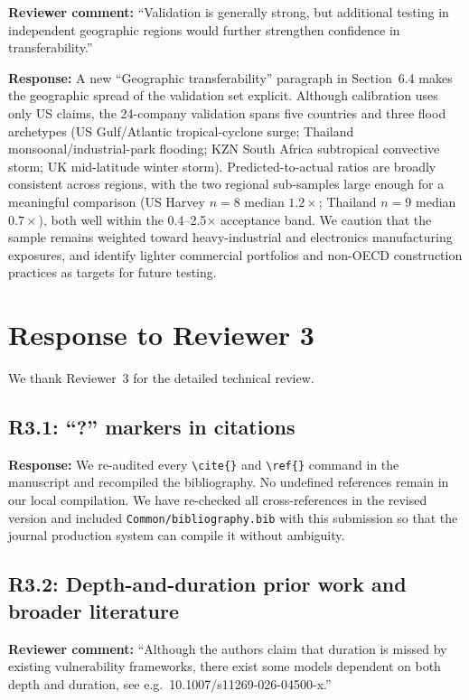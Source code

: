 \documentclass[11pt]{article}
\begin{document}
\textbf{Reviewer comment:} ``Validation is generally strong, but additional testing in independent geographic regions would further strengthen confidence in transferability.''

\textbf{Response:} A new ``Geographic transferability'' paragraph in Section~6.4 makes the geographic spread of the validation set explicit. Although calibration uses only US claims, the 24-company validation spans five countries and three flood archetypes (US Gulf/Atlantic tropical-cyclone surge; Thailand monsoonal/industrial-park flooding; KZN South Africa subtropical convective storm; UK mid-latitude winter storm). Predicted-to-actual ratios are broadly consistent across regions, with the two regional sub-samples large enough for a meaningful comparison (US Harvey $n = 8$ median $1.2\times$; Thailand $n = 9$ median $0.7\times$), both well within the 0.4--2.5$\times$ acceptance band. We caution that the sample remains weighted toward heavy-industrial and electronics manufacturing exposures, and identify lighter commercial portfolios and non-OECD construction practices as targets for future testing.

\section*{Response to Reviewer 3}

We thank Reviewer~3 for the detailed technical review.

\subsection*{R3.1: ``?'' markers in citations}

\textbf{Response:} We re-audited every \texttt{\textbackslash cite\{\}} and \texttt{\textbackslash ref\{\}} command in the manuscript and recompiled the bibliography. No undefined references remain in our local compilation. We have re-checked all cross-references in the revised version and included \texttt{Common/bibliography.bib} with this submission so that the journal production system can compile it without ambiguity.

\subsection*{R3.2: Depth-and-duration prior work and broader literature}

\textbf{Reviewer comment:} ``Although the authors claim that duration is missed by existing vulnerability frameworks, there exist some models dependent on both depth and duration, see e.g.\ 10.1007/s11269-026-04500-x.''
\end{document}
